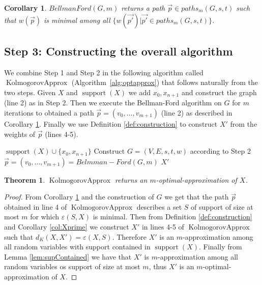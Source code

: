 \documentclass{article}
\newtheorem{theorem}[thm]{Theorem}
\newtheorem{corollary}[thm]{Corollary}
\DeclareMathOperator{\support}{support}
\DeclareMathOperator{\KlmApprox}{KolmogorovApprox}
\begin{document}
\begin{corollary}\label{cor:Bellman}
$BellmanFord(G,m)$ returns a path $\vec{p}\in paths_m(G, s, t)$ such that $w(\vec{p})$ is minimal among all $\{w(\vec{p'}) | \vec{p'}\in paths_m(G, s, t)\}$.
\end{corollary}


\subsection*{Step 3: Constructing the overall algorithm}

We combine Step 1 and Step 2 in the following algorithm called $\KlmApprox$ (Algorithm~\ref{alg:optapprox}) that follows naturally from the two steps. Given $X$ and $\support(X)$ we add $x_0,x_{n+1}$ and construct the graph (line 2) as in Step 2. Then we execute the Bellman-Ford algorithm on $G$ for $m$ iterations to obtained a path $\vec{p}=(v_0,\dots,v_{m+1})$ (line 2) as described in Corollary \ref{cor:Bellman}. Finally we use Definition \ref{def:construction} to construct $X'$ from the weights of $\vec{p}$ (lines 4-5).






\begin{algorithm}\label{alg:optapprox}
	\DontPrintSemicolon
	$\support(X)\cup \{x_0,x_{n+1}\}$\;
	Construct $G=(V,E,s,t,w)$ according to Step 2 \;
	$\vec{p}=(v_0,\dots,v_{m+1}) = Belmman-Ford(G,m)$  \;
	\Return $X'$\;
	
	\caption{$\KlmApprox (X, m)$}  
	\label{alg:sequence}
\end{algorithm}



\begin{theorem}\label{the:algo}
	$\KlmApprox$ returns an $m$-optimal-approximation of $X$.
\end{theorem}
\begin{proof}
From Corollary \ref{cor:Bellman} and the construction of $G$ we get that the path $\vec{p}$ obtained in line 4 of  $\KlmApprox$ describes a set $S$ of support of size at most $m$ for which $\varepsilon(S,X)$ is minimal. Then from Definition \ref{def:construction} and Corollary \ref{col:Xprime} we construct $X'$ in lines 4-5 of 	$\KlmApprox$ such that $d_K(X,X') = \varepsilon(X,S)$. Therefore $X'$ is an $m$-approximation among all random variables with support contained in $\support(X)$. Finally from Lemma \ref{lem:supContained} we have that $X'$ is  $m$-approximation among all random variables os support of size at most $m$, thus  $X'$ is an $m$-optimal-approximation of $X$.
\end{proof}
\end{document}
